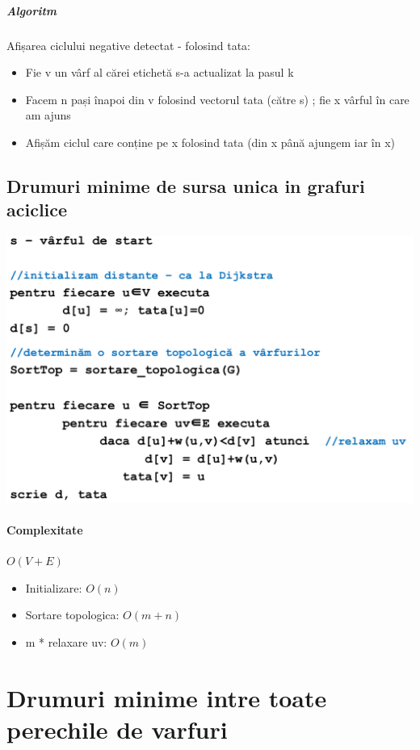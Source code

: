 \documentclass{article}
\begin{document}
\subparagraph*{Algoritm}Afișarea ciclului negative detectat - folosind tata:
\begin{itemize}
    \item Fie v un vârf al cărei etichetă s-a actualizat la pasul k
    \item  Facem n pași înapoi din v folosind vectorul tata (către s) ; fie x vârful în care am ajuns
    \item Afișăm ciclul care conține pe x folosind tata (din x până ajungem iar în x)
\end{itemize}

\subsection*{Drumuri minime de sursa unica in grafuri aciclice}
\begin{center}
    \includegraphics[scale=0.3]{8_drumminim_sursaunica.png}
\end{center}

\paragraph*{Complexitate} $O(V+E)$
\begin{itemize}
    \item Initializare: $O(n)$
    \item Sortare topologica: $O(m+n)$
    \item m * relaxare uv: $O(m)$
\end{itemize}

\section{Drumuri minime intre toate perechile de varfuri}
\end{document}
